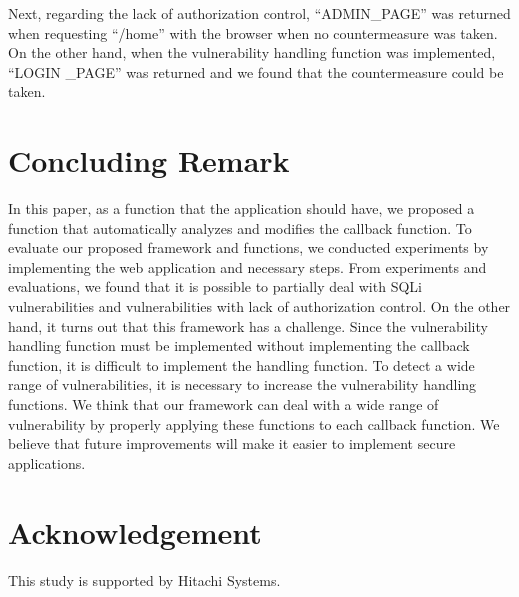 \documentclass[conference]{IEEEtran}
\begin{document}
Next, regarding the lack of authorization control, ``ADMIN\_PAGE'' was returned when requesting ``/home'' with the browser when no countermeasure was taken.
On the other hand, when the vulnerability handling function was implemented, ``LOGIN \_PAGE'' was returned and we found that the countermeasure could be taken.

\section{Concluding Remark}
In this paper, as a function that the application should have, we proposed a function that automatically analyzes and modifies the callback function.
To evaluate our proposed framework and functions, we conducted experiments by implementing the web application and necessary steps.
From experiments and evaluations, we found that it is possible to partially deal with SQLi vulnerabilities and vulnerabilities with lack of authorization control.
On the other hand, it turns out that this framework has a challenge.
Since the vulnerability handling function must be implemented without implementing the callback function, it is difficult to implement the handling function.
To detect a wide range of vulnerabilities, it is necessary to increase the vulnerability handling functions.
We think that our framework can deal with a wide range of vulnerability by properly applying these functions to each callback function.
We believe that future improvements will make it easier to implement secure applications.

\section*{Acknowledgement}
This study is supported by Hitachi Systems.



\end{document}
